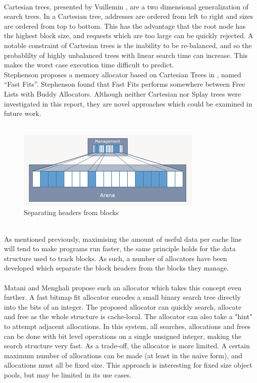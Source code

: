 \documentclass{article}
\begin{document}
\\
Cartesian trees, presented by Vuillemin \cite{10.1145/358841.358852}, are a two dimensional generalization of search trees. In a Cartesian tree, addresses are ordered from left to right and sizes are ordered from top to bottom. This has the advantage that the root node has the highest block size, and requests which are too large can be quickly rejected. A notable constraint of Cartesian trees is the inability to be re-balanced, and so the probablilty of highly unbalanced trees with linear search time can increase. This makes the worst case execution time difficult to predict.\\
Stephenson proposes a memory allocator based on Cartesian Trees in \cite{10.1145/800217.806613}, named ``Fast Fits''. Stephenson found that Fast Fits performs somewhere between Free Lists with Buddy Allocators. Although neither Cartesian nor Splay trees were investigated in this report, they are novel approaches which could be examined in future work.\\
\\
\begin{figure}[htbp]
	\centering
	\includegraphics[width=9cm]{arena_allocator}
	\captionsetup{width=10cm}
	\caption{Separating headers from blocks}
\end{figure}
\\
As mentioned previously, maximising the amount of useful data per cache line will tend to make programs run faster, the same principle holds for the data structure used to track blocks. As such, a number of allocators have been developed which separate the block headers from the blocks they manage.\\
\\
Matani and Menghali \cite{matani2021fastbitmapfitcpu} propose such an allocator which takes this concept even further. A fast bitmap fit allocator encodes a small binary search tree directly into the bits of an integer. The proposed allocator can quickly search, allocate and free as the whole structure is cache-local. The allocator can also take a "hint" to attempt adjacent allocations. In this system, all searches, allocations and frees can be done with bit level operations on a single unsigned integer, making the search structure very fast. As a trade-off, the allocator is more limited. A certain maximum number of allocations can be made (at least in the naive form), and allocations must all be fixed size. This approach is interesting for fixed size object pools, but may be limited in its use cases.\\
\end{document}
